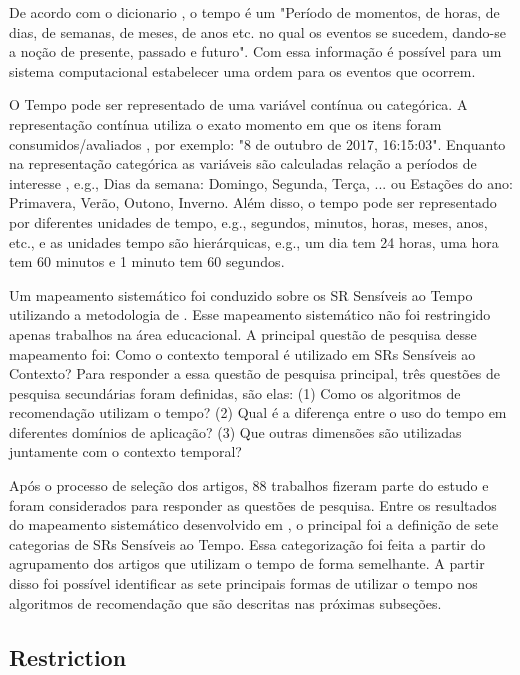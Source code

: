 De acordo com o dicionario , o tempo é um  "Período de momentos, de horas, de dias,
de semanas, de meses, de anos etc. no qual os eventos se sucedem, dando-se a noção de presente, passado e futuro".
Com essa informação é possível para um sistema computacional estabelecer uma ordem para os eventos que ocorrem.

O Tempo pode ser representado de uma variável contínua ou categórica. A representação contínua utiliza o exato momento
em que os itens foram consumidos/avaliados \cite{campos2014time}, por exemplo: "8 de outubro de 2017, 16:15:03".
Enquanto na representação categórica as variáveis são calculadas relação a períodos de interesse \cite{campos2014time},
e.g., Dias da semana: {Domingo, Segunda, Terça, ...} ou Estações do ano: {Primavera, Verão, Outono, Inverno}. Além
disso, o tempo pode ser representado por diferentes unidades de tempo, e.g., segundos, minutos, horas, meses, anos,
etc., e as unidades tempo são hierárquicas, e.g., um dia tem 24 horas, uma hora tem 60 minutos e 1 minuto tem 60
segundos.

Um mapeamento sistemático foi conduzido sobre os SR Sensíveis ao Tempo \cite{de2017time} utilizando a metodologia de
. Esse mapeamento sistemático não foi restringido apenas trabalhos na área
educacional. A principal questão de pesquisa desse mapeamento foi: Como o contexto temporal é utilizado em SRs
Sensíveis ao Contexto? Para responder a essa questão de pesquisa principal, três questões de pesquisa secundárias
foram definidas, são elas: (1) Como os algoritmos de recomendação utilizam o tempo? (2) Qual é a diferença entre o uso
do tempo em diferentes domínios de aplicação? (3) Que outras dimensões são utilizadas juntamente com o contexto
temporal?

Após o processo de seleção dos artigos, 88 trabalhos fizeram parte do estudo e foram considerados para responder as
questões de pesquisa. Entre os resultados do mapeamento sistemático desenvolvido em , o principal
foi a definição de sete categorias de SRs Sensíveis ao Tempo. Essa categorização foi feita a partir do agrupamento
dos artigos que utilizam o tempo de forma semelhante. A partir disso foi possível identificar as sete principais
formas de utilizar o tempo nos algoritmos de recomendação que são descritas nas próximas subseções.

\subsection{Restriction}


